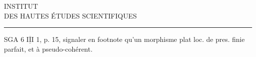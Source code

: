 \begin{center}
INSTITUT\\
DES HAUTES ÉTUDES SCIENTIFIQUES\\[-.4ex]
\rule{1.4cm}{.4pt}
\end{center}

SGA 6 $\overline{\underline{\mathrm{III}}}$ 1, p. 15, signaler en footnote
qu'un morphisme plat loc. de pres. finie 
parfait, et à  pseudo-cohérent.
